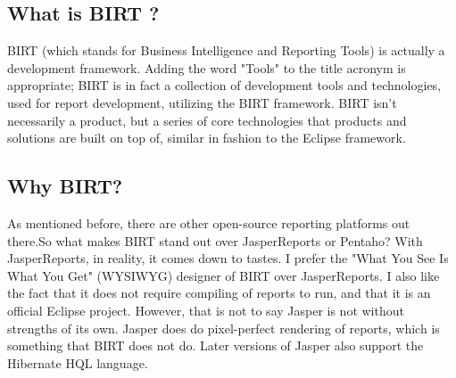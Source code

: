 \subsection{What is BIRT ?}
BIRT (which stands for Business Intelligence and Reporting Tools) is actually a development framework. Adding the word "Tools" to the title acronym is appropriate; BIRT is in fact a collection of development tools and technologies, used for report development, utilizing the BIRT framework. BIRT isn't necessarily a product, but a series of core technologies that products and solutions are built on top of, similar in fashion to the Eclipse framework.

\subsection{Why BIRT?}
As mentioned before, there are other open-source reporting platforms out there.So what makes BIRT stand out over JasperReports or Pentaho? With JasperReports, in reality, it comes down to tastes. I prefer the "What You See Is What You Get" (WYSIWYG) designer of BIRT over JasperReports. I also like the fact that it does not require compiling of reports to run, and that it is an official Eclipse project. However, that is not to say Jasper is not without strengths of its own. Jasper does do pixel-perfect rendering of reports, which is something that BIRT does not do. Later
versions of Jasper also support the Hibernate HQL language.